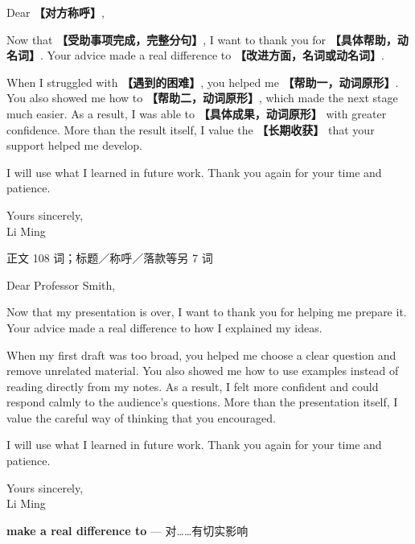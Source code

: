 \documentclass[11pt,a4paper,fontset=macnew]{ctexart}
\newenvironment{writing}{\begingroup\fontsize{10.5}{13.5}\selectfont\setlength{\parskip}{3pt}}{\par\endgroup}
\newenvironment{example}{\begingroup\fontsize{11}{14.3}\selectfont\setlength{\parskip}{4pt}}{\par\endgroup}
\begin{document}
\begin{writing}
\noindent Dear {\bfseries 【对方称呼】},\par
Now that {\bfseries 【受助事项完成，完整分句】}, I want to thank you for {\bfseries 【具体帮助，动名词】}. Your advice made a real difference to {\bfseries 【改进方面，名词或动名词】}.

When I struggled with {\bfseries 【遇到的困难】}, you helped me {\bfseries 【帮助一，动词原形】}. You also showed me how to {\bfseries 【帮助二，动词原形】}, which made the next stage much easier. As a result, I was able to {\bfseries 【具体成果，动词原形】} with greater confidence. More than the result itself, I value the {\bfseries 【长期收获】} that your support helped me develop.

I will use what I learned in future work. Thank you again for your time and patience.

\noindent Yours sincerely,\\Li Ming\par
\end{writing}
\par\vspace{4pt}{\bfseries 完整套用示例}\par\nopagebreak
{\small 正文 108 词；标题／称呼／落款等另 7 词}\par
\begin{example}
\noindent Dear Professor Smith,\par
Now that my presentation is over, I want to thank you for helping me prepare it. Your advice made a real difference to how I explained my ideas.

When my first draft was too broad, you helped me choose a clear question and remove unrelated material. You also showed me how to use examples instead of reading directly from my notes. As a result, I felt more confident and could respond calmly to the audience's questions. More than the presentation itself, I value the careful way of thinking that you encouraged.

I will use what I learned in future work. Thank you again for your time and patience.

\noindent Yours sincerely,\\Li Ming\par
\end{example}
\par\vspace{4pt}{\bfseries 好词好句：优先记这三处}\par\nopagebreak
{\small\textbf{make a real difference to} — 对……有切实影响}\par
\end{document}
